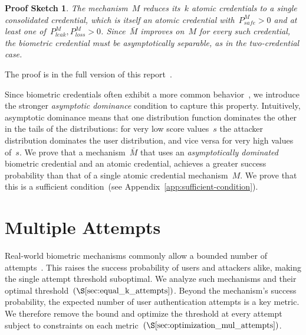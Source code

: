 \documentclass[conference,compsoc]{IEEEtran}
\newtheorem*{proofsketch}{Proof Sketch}
\begin{document}
\begin{proofsketch}
The mechanism~$M$ reduces its~$k$ atomic credentials to a single consolidated credential, which is itself an atomic credential with~$P^M_{safe} > 0$ and at least one of~$P^M_{leak}, P^M_{loss} > 0$.
Since~$\bar{M}$ improves on~$M$ for every such credential, the biometric credential must be asymptotically separable, as in the two-credential case.
\end{proofsketch}
\noindent
The proof is in the full version of this report~\cite{biometric_full_version}.

Since biometric credentials often exhibit a more common behavior~\cite{Slob2005,anil2004}, we introduce the stronger \emph{asymptotic dominance} condition to capture this property. Intuitively, asymptotic dominance means that one distribution function dominates the other in the tails of the distributions: for very low score values~$s$ the attacker distribution dominates the user distribution, and vice versa for very high values of~$s$. We prove that a mechanism~$\bar{M}$ that uses an \emph{asymptotically dominated} biometric credential and an atomic credential, achieves a greater success probability than that of a single atomic credential mechanism~$M$. We prove that this is a sufficient condition~(see Appendix~\ref{app:sufficient-condition}). 


\section{Multiple Attempts}
\label{sec:multiple_auth_attempts}
\noindent
Real-world biometric mechanisms commonly allow a bounded number of attempts~\cite{Chen2023BrutePrint, typical_aut_attempts}. This raises the success probability of users and attackers alike, making the single attempt threshold suboptimal. We analyze such mechanisms and their optimal threshold~$(\S\ref{sec:equal_k_attempts})$. Beyond the mechanism's success probability, the expected number of user authentication attempts is a key metric. We therefore remove the bound and optimize the threshold at every attempt subject to constraints on each metric~$(\S\ref{sec:optimization_mul_attempts})$.
\end{document}
